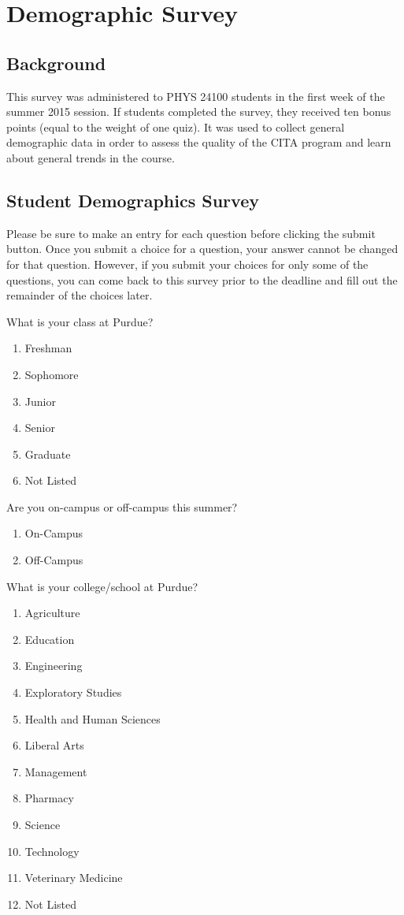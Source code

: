 \chapter{Demographic Survey}

\section{Background}
This survey was administered to PHYS 24100 students in the first week of the summer 2015 session. If students completed the survey, they received ten bonus points (equal to the weight of one quiz). It was used to collect general demographic data in order to assess the quality of the CITA program and learn about general trends in the course.

\section{Student Demographics Survey}

Please be sure to make an entry for each question before clicking the submit button. Once you submit a choice for a question, your answer cannot be changed for that question. However, if you submit your choices for only some of the questions, you can come back to this survey prior to the deadline and fill out the remainder of the choices later.

What is your class at Purdue?

\begin{enumerate}
	\item Freshman
	\item Sophomore
	\item Junior
	\item Senior
	\item Graduate
	\item Not Listed
\end{enumerate}

Are you on-campus or off-campus this summer?

\begin{enumerate}
	\item On-Campus
	\item Off-Campus
\end{enumerate}

What is your college/school at Purdue?

\begin{enumerate}
	\item Agriculture
	\item Education
	\item Engineering
	\item Exploratory Studies
	\item Health and Human Sciences
	\item Liberal Arts
	\item Management
	\item Pharmacy
	\item Science
	\item Technology
	\item Veterinary Medicine
	\item Not Listed
\end{enumerate}


